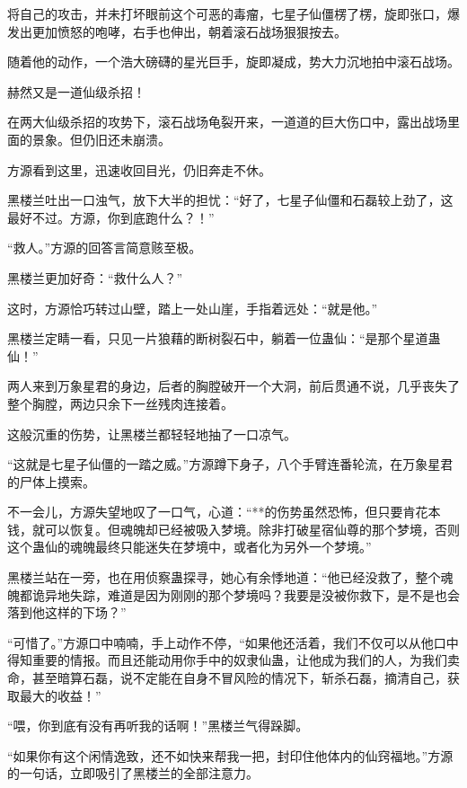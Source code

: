 
\begin{this_body}

将自己的攻击，并未打坏眼前这个可恶的毒瘤，七星子仙僵楞了楞，旋即张口，爆发出更加愤怒的咆哮，右手也伸出，朝着滚石战场狠狠按去。

随着他的动作，一个浩大磅礴的星光巨手，旋即凝成，势大力沉地拍中滚石战场。

赫然又是一道仙级杀招！

在两大仙级杀招的攻势下，滚石战场龟裂开来，一道道的巨大伤口中，露出战场里面的景象。但仍旧还未崩溃。

方源看到这里，迅速收回目光，仍旧奔走不休。

黑楼兰吐出一口浊气，放下大半的担忧：“好了，七星子仙僵和石磊较上劲了，这最好不过。方源，你到底跑什么？！”

“救人。”方源的回答言简意赅至极。

黑楼兰更加好奇：“救什么人？”

这时，方源恰巧转过山壁，踏上一处山崖，手指着远处：“就是他。”

黑楼兰定睛一看，只见一片狼藉的断树裂石中，躺着一位蛊仙：“是那个星道蛊仙！”

两人来到万象星君的身边，后者的胸膛破开一个大洞，前后贯通不说，几乎丧失了整个胸膛，两边只余下一丝残肉连接着。

这般沉重的伤势，让黑楼兰都轻轻地抽了一口凉气。

“这就是七星子仙僵的一踏之威。”方源蹲下身子，八个手臂连番轮流，在万象星君的尸体上摸索。

不一会儿，方源失望地叹了一口气，心道：“**的伤势虽然恐怖，但只要肯花本钱，就可以恢复。但魂魄却已经被吸入梦境。除非打破星宿仙尊的那个梦境，否则这个蛊仙的魂魄最终只能迷失在梦境中，或者化为另外一个梦境。”

黑楼兰站在一旁，也在用侦察蛊探寻，她心有余悸地道：“他已经没救了，整个魂魄都诡异地失踪，难道是因为刚刚的那个梦境吗？我要是没被你救下，是不是也会落到他这样的下场？”

“可惜了。”方源口中喃喃，手上动作不停，“如果他还活着，我们不仅可以从他口中得知重要的情报。而且还能动用你手中的奴隶仙蛊，让他成为我们的人，为我们卖命，甚至暗算石磊，说不定能在自身不冒风险的情况下，斩杀石磊，摘清自己，获取最大的收益！”

“喂，你到底有没有再听我的话啊！”黑楼兰气得跺脚。

“如果你有这个闲情逸致，还不如快来帮我一把，封印住他体内的仙窍福地。”方源的一句话，立即吸引了黑楼兰的全部注意力。


\end{this_body}
